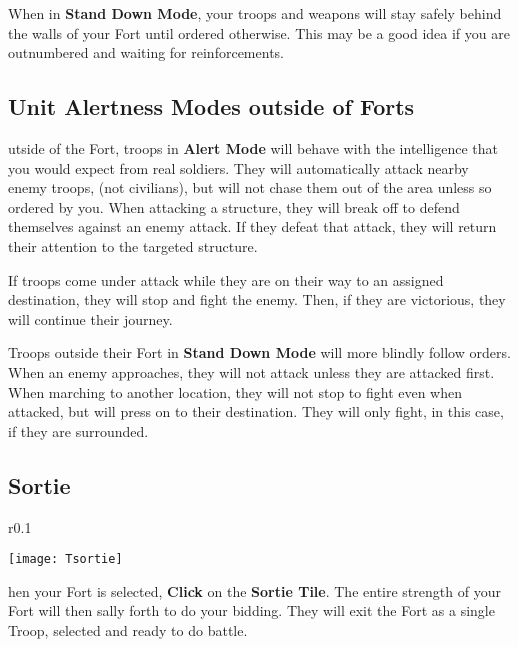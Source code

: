 When in \textbf{Stand Down Mode}, your troops and weapons will stay safely behind the walls of your Fort until ordered otherwise. This may be a good idea if you are outnumbered and waiting for reinforcements.

\subsection{Unit Alertness Modes outside of Forts}


utside of the Fort, troops in \textbf{Alert Mode} will behave with the intelligence that you would expect from real soldiers. They will automatically attack nearby enemy troops, (not civilians), but will not chase them out of the area unless so ordered by you. When attacking a structure, they will break off to defend themselves against an enemy attack. If they defeat that attack, they will return their attention to the targeted structure.

If troops come under attack while they are on their way to an assigned destination, they will stop and fight the enemy. Then, if they are victorious, they will continue their journey.

Troops outside their Fort in \textbf{Stand Down Mode} will more blindly follow orders. When an enemy approaches, they will not attack unless they are attacked first. When marching to another location, they will not stop to fight even when attacked, but will press on to their destination. They will only fight, in this case, if they are surrounded.

\subsection{Sortie}


\begin{wrapfigure}{r}{0.1\textwidth}
    \vspace{-20pt}
    \begin{center}
        \texttt{[image: Tsortie]}
    \end{center}
    \vspace{-20pt}
\end{wrapfigure}

hen your Fort is selected, \textbf{Click} on the \textbf{Sortie Tile}. The entire strength of your Fort will then sally forth to do your bidding. They will exit the Fort as a single Troop, selected and ready to do battle.

